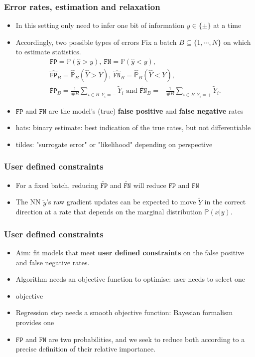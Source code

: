 \documentclass{beamer}
\newcommand{\TWO}{\{\pm\}}
\newcommand{\PREDSMOOTH}{{\tilde y}}%
\newcommand{\yP}{{\hat y}}
\newcommand{\YP}{{\hat Y}}
\newcommand{\YN}{{\tilde Y}}
\newcommand{\Prob}{{\mathbb P}}
\newcommand{\ProbH}{{\widehat{\mathbb P}}}
\newcommand{\FP}{{\texttt{FP}}}
\newcommand{\FN}{{\texttt{FN}}}
\newcommand{\FPE}{{\widehat{\texttt{FP}}}}
\newcommand{\FNE}{{\widehat{\texttt{FN}}}}
\newcommand{\Fp}{\widetilde{\texttt{FP}}}
\newcommand{\Fn}{\widetilde{\texttt{FN}}}
\begin{document}
\begin{frame}
\frametitle{Error rates, estimation and relaxation}
  \begin{itemize}
\item
In this setting only need to infer one bit of information $y\in\TWO$ at a time
\item
Accordingly, two possible types of errors
Fix a batch $B\subseteq\{1,\cdots,N\}$ on which to estimate statistics.
\begin{gather*}
  \FP=\Prob(\yP>y),~\FN=\Prob(\yP<y),\\
  \FPE_B=\ProbH_B(\YP>Y),~\FNE_B=\ProbH_B(\YP<Y),\\
  \Fp_B=\tfrac1{\#B}\sum_{i\in B:Y_i=-}\YN_i\text{ and }\Fn_B=-\tfrac1{\#B}\sum_{i\in B:Y_i=+}\YN_i.
\end{gather*}
\item
  $\FP$ and $\FN$ are the model's (true) \textbf{false positive} and \textbf{false negative} rates
\item hats: binary estimate: best indication of the true rates, but not differentiable
\item tildes: "surrogate error" or "likelihood" depending on perspective
\end{itemize}
\end{frame}
\begin{frame}
\frametitle{User defined constraints}
\begin{itemize}
\item
  For a fixed batch, reducing $\Fp$ and $\Fn$ will reduce $\FP$ and $\FN$
\item
  The NN $\PREDSMOOTH$'s raw gradient updates can be expected to move $\YN$ in the correct direction at a rate that depends on the marginal distribution $\mathbb P(x|y)$.
\end{itemize}
\end{frame}
\begin{frame}
\frametitle{User defined constraints}
\begin{itemize}
\item
  Aim: fit models that meet \textbf{user defined constraints} on the false positive and false negative rates.
\item
  Algorithm needs an objective function to optimise: user needs to select one
\item
  objective 
\item
  Regression step needs a smooth objective function: Bayesian formalism provides one
\item
  $\FP$ and $\FN$ are two probabilities, and we seek to reduce both according to a precise definition of their relative importance.
\end{itemize}
\end{frame}
\end{document}
